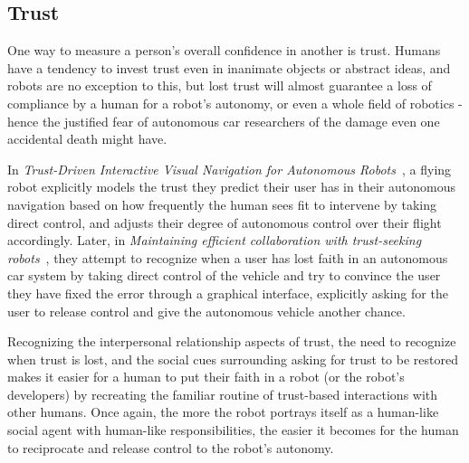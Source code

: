 \documentclass{sfuthesis}
\begin{document}



\subsection{Trust}

One way to measure a person's overall confidence in another is trust. Humans have a tendency to invest trust even in inanimate objects or abstract ideas, and robots are no exception to this, but lost trust will almost guarantee a loss of compliance by a human for a robot's autonomy, or even a whole field of robotics - hence the justified fear of autonomous car researchers of the damage even one accidental death might have.

In \textit{Trust-Driven Interactive Visual Navigation for Autonomous Robots}~\cite{xu2012trust}, a flying robot explicitly models the trust they predict their user has in their autonomous navigation based on how frequently the human sees fit to intervene by taking direct control, and adjusts their degree of autonomous control over their flight accordingly. Later, in \textit{Maintaining efficient collaboration with trust-seeking robots}~\cite{xu2016maintaining}, they attempt to recognize when a user has lost faith in an autonomous car system by taking direct control of the vehicle and try to convince the user they have fixed the error through a graphical interface, explicitly asking for the user to release control and give the autonomous vehicle another chance. 

Recognizing the interpersonal relationship aspects of trust, the need to recognize when trust is lost, and the social cues surrounding asking for trust to be restored makes it easier for a human to put their faith in a robot (or the robot's developers) by recreating the familiar routine of trust-based interactions with other humans. Once again, the more the robot portrays itself as a human-like social agent with human-like responsibilities, the easier it becomes for the human to reciprocate and release control to the robot's autonomy.


\end{document}
